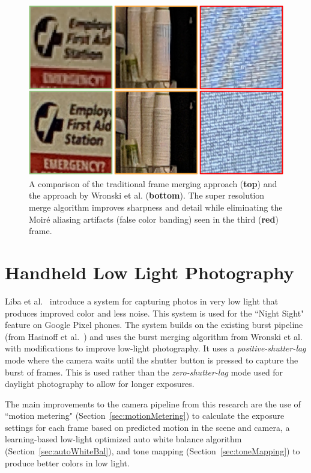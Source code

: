 \documentclass{sig-alternate}
\begin{document}
\begin{figure}
\centering
\includegraphics[width=\columnwidth]{figures/wronski2019-figure-1-100quality-crop.jpg}

\caption{A comparison of the traditional frame merging approach (\textbf{top}) and the approach by Wronski et al. (\textbf{bottom}). The super resolution merge algorithm improves sharpness and detail while eliminating the 
Moiré aliasing artifacts (false color banding) seen in the third (\textbf{red}) frame.~\cite{Wronski2019}}


\label{fig:wronskiResults}
\end{figure}

\section{Handheld Low Light Photography}
\label{sec:handheldLowLight}

Liba et al.~\cite{Liba2019} introduce a system for capturing photos in very low light that produces improved color and less noise. This system is used for the ``Night Sight" feature on Google Pixel phones.
The system builds on the existing burst pipeline (from Hasinoff et al.~\cite{Hasinoff2016}) and uses the burst merging algorithm from Wronski et al.~\cite{Wronski2019} with modifications to improve low-light photography. It uses a \emph{positive-shutter-lag} mode where the camera waits until the shutter button is pressed to capture the burst of frames. This is used rather than the \emph{zero-shutter-lag} mode used for daylight photography to allow for longer exposures.

The main improvements to the camera pipeline from this research are the use of ``motion metering" (Section~\ref{sec:motionMetering}) to calculate the exposure settings for each frame based on predicted motion in the scene and camera, a learning-based low-light optimized auto white balance algorithm (Section~\ref{sec:autoWhiteBal}), and tone mapping (Section~\ref{sec:toneMapping}) to produce better colors in low light.
\end{document}
